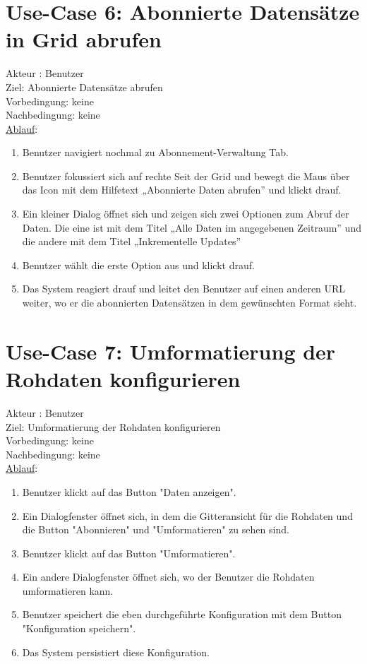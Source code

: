 \documentclass[a4paper,12pt]{scrreprt}
\begin{document}
\section*{\small \textbf{Use-Case 6: Abonnierte Datensätze in Grid abrufen}}
Akteur : Benutzer\\
Ziel: Abonnierte Datensätze abrufen\\
Vorbedingung: keine\\
Nachbedingung: keine\\
\underline{Ablauf}:
\begin{enumerate}
	\item Benutzer navigiert nochmal zu Abonnement-Verwaltung Tab. 
	\item Benutzer fokussiert sich auf rechte Seit der Grid und bewegt die Maus über das Icon mit dem Hilfetext „Abonnierte Daten abrufen” und klickt drauf.
	\item Ein kleiner Dialog öffnet sich und zeigen sich zwei Optionen zum Abruf der Daten. Die eine ist mit dem Titel „Alle Daten im angegebenen Zeitraum” und die andere mit dem Titel „Inkrementelle Updates”
	\item Benutzer wählt die erste Option aus und klickt drauf.
	\item Das System reagiert drauf und leitet den Benutzer auf einen anderen URL weiter, wo er die abonnierten Datensätzen in dem gewünschten Format sieht. 
\end{enumerate}

\section*{\small \textbf{Use-Case 7: Umformatierung der Rohdaten konfigurieren}}
Akteur : Benutzer\\
Ziel: Umformatierung der Rohdaten konfigurieren\\
Vorbedingung: keine\\
Nachbedingung: keine\\
\underline{Ablauf}:
\begin{enumerate}
	\item Benutzer klickt auf das Button "Daten anzeigen".
	\item Ein Dialogfenster öffnet sich, in dem die Gitteransicht für die Rohdaten und die Button "Abonnieren" und "Umformatieren" zu sehen sind.
	\item Benutzer klickt auf das Button "Umformatieren".
	\item Ein andere Dialogfenster öffnet sich, wo der Benutzer die Rohdaten umformatieren kann.
	\item Benutzer speichert die eben durchgeführte Konfiguration mit dem Button "Konfiguration speichern".
	\item Das System persistiert diese Konfiguration.  
\end{enumerate}
	
\end{document}
